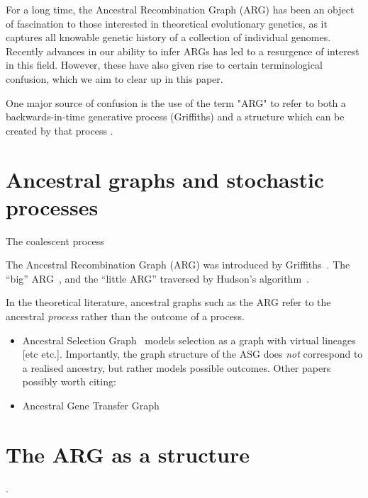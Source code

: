 \documentclass{article}
\begin{document}
For a long time, the Ancestral Recombination Graph (ARG) has been an object of fascination
to those interested in theoretical evolutionary genetics, as it captures all knowable genetic
history of a collection of individual genomes. Recently advances in our ability to infer ARGs
has led to a resurgence of interest in this field. However, these have also given rise to certain
terminological confusion, which we aim to clear up in this paper.

One major source of confusion is the use of the term "ARG" to refer to both a backwards-in-time
generative process (Griffiths) and a structure which can be created by that process \citep[e.g.][]{minichiello2006mapping,mathieson2020ancestry}.

\section*{Ancestral graphs and stochastic processes}

The coalescent
process~\citep{kingman1982coalescent,kingman1982genealogy,hudson1983testing,
tajima1983evolutionary}

The Ancestral Recombination Graph (ARG) was introduced by
Griffiths~\citep{griffiths1991two,griffiths1997ancestral}.
The ``big'' ARG~\citep{ethier1990two},
and the ``little ARG'' traversed by
Hudson's algorithm~\citep{hudson1983properties}.


In the theoretical literature, ancestral graphs such as the ARG refer to the
ancestral \emph{process} rather than the outcome of a process.
\begin{itemize}
\item Ancestral Selection
Graph~\citep{krone1997ancestral,neuhauser1999ancestral} models selection
as a graph with virtual lineages [etc etc.]. Importantly, the graph structure
of the ASG does \emph{not} correspond to a realised ancestry, but rather
models possible outcomes.
Other papers possibly worth citing:\citep{etheridge2009coalescent}
\item Ancestral Gene Transfer Graph~\citep{baumdicker2014infinitely}
\end{itemize}

\section*{The ARG as a structure}

\citep[e.g.][]{minichiello2006mapping,mathieson2020ancestry}.

\end{document}
